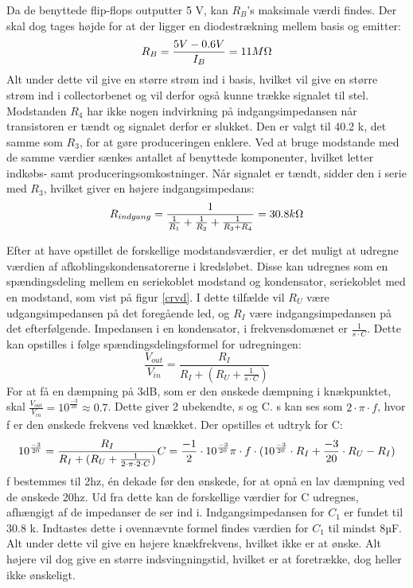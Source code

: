Da de benyttede flip-flops outputter 5 V, kan $R_B$'s maksimale værdi findes. Der skal dog tages højde for at der ligger en diodestrækning mellem basis og emitter:
\begin{equation}
R_B = \frac{5 V-0.6V}{I_B} =  11M\ohm
\end{equation}
Alt under dette vil give en større strøm ind i basis, hvilket vil give en større strøm ind i collectorbenet og vil derfor også kunne trække signalet til stel.
Modstanden $R_4$ har ikke nogen indvirkning på indgangsimpedansen når transistoren er tændt og signalet derfor er slukket. Den er valgt til 40.2 k\ohm, det samme som $R_3$, for at gøre produceringen enklere. Ved at bruge modstande med de samme værdier sænkes antallet af benyttede komponenter, hvilket letter indkøbs- samt produceringsomkostninger. Når signalet er tændt, sidder den i serie med $R_3$, hvilket giver en højere indgangsimpedans:
\begin{equation}
R_{indgang}=\frac{1}{\frac{1}{R_1}+\frac{1}{R_2}+\frac{1}{R_3+R_4}}=30.8 k\ohm
\end{equation}

Efter at have opstillet de forskellige modstandsværdier, er det muligt at udregne værdien af afkoblingskondensatorerne i kredsløbet. Disse kan udregnes som en spændingsdeling mellem en seriekoblet modstand og kondensator, seriekoblet med en modstand, som vist på figur \ref{crvd}. I dette tilfælde vil $R_U$ være udgangsimpedansen på det foregående led, og $R_I$ være indgangsimpedansen på det efterfølgende. Impedansen i en kondensator, i frekvensdomænet er $\frac{1}{s\cdot C}$. Dette kan opstilles i følge spændingsdelingsformel for udregningen:
\begin{equation}
\frac{V_{out}}{V_{in}}=\frac{R_I}{R_I+(R_U+\frac{1}{s\cdot C})}
\end{equation}
For at få en dæmpning på 3dB, som er den ønskede dæmpning i knækpunktet, skal $\frac{V_{out}}{V_{in}}=10^{\frac{-3}{20}}\approx0.7$. 
Dette giver 2 ubekendte, s og C. s kan ses som $2\cdot \pi \cdot f$, hvor f er den ønskede frekvens ved knækket. Der opstilles et udtryk for C:
\begin{equation}
10^{\frac{-3}{20}}=\frac{R_I}{R_I+(R_U+\frac{1}{2\cdot\pi\cdot 2\cdot C})}\\
C=\frac{-1}{2}\cdot{10^{\frac{-3}{20}}}{\pi\cdot f\cdot(10^{\frac{-3}{20}}\cdot R_I+\frac{-3}{20}}\cdot R_U - R_I)
\end{equation}
f bestemmes til 2hz, én dekade før den ønskede, for at opnå en lav dæmpning ved de ønskede 20hz. Ud fra dette kan de forskellige værdier for C udregnes, afhængigt af de impedanser de ser ind i.
Indgangsimpedansen for $C_1$ er fundet til 30.8 k\ohm . Indtastes dette i ovennævnte formel findes værdien for $C_1$ til mindst 8µF. Alt under dette vil give en højere knækfrekvens, hvilket ikke er at ønske. Alt højere vil dog give en større indsvingningstid, hvilket er at foretrække, dog heller ikke ønskeligt.